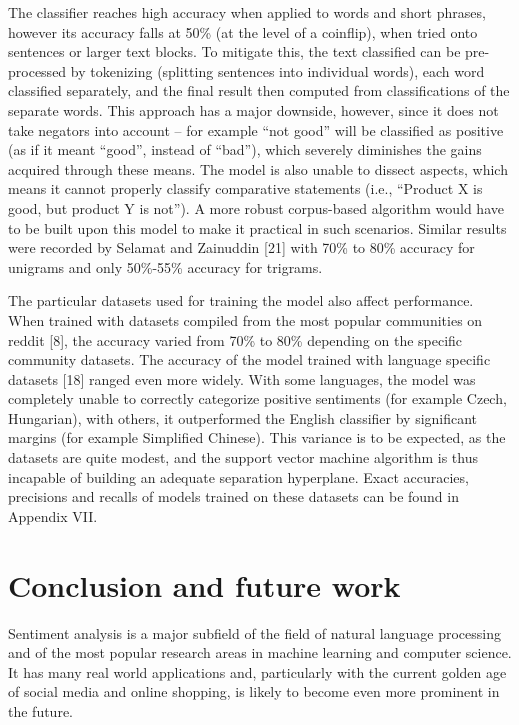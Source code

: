 \documentclass[12pt,journal,compsoc]{IEEEtran}
\begin{document}
The classifier reaches high accuracy when applied to words and short phrases, however its accuracy falls at 50\% (at the level of a coinflip), when tried onto sentences or larger text blocks. To mitigate this, the text classified can be pre-processed by tokenizing (splitting sentences into individual words), each word classified separately, and the final result then computed from classifications of the separate words. This approach has a major downside, however, since it does not take negators into account – for example “not good” will be classified as positive (as if it meant “good”, instead of “bad”), which severely diminishes the gains acquired through these means. The model is also unable to dissect aspects, which means it cannot properly classify comparative statements (i.e., “Product X is good, but product Y is not”). A more robust corpus-based algorithm would have to be built upon this model to make it practical in such scenarios. Similar results were recorded by Selamat and Zainuddin [21] with 70\% to 80\% accuracy for unigrams and only 50\%-55\% accuracy for trigrams.

The particular datasets used for training the model also affect performance. When trained with datasets compiled from the most popular communities on reddit [8], the accuracy varied from 70\% to 80\% depending on the specific community datasets. The accuracy of the model trained with language specific datasets [18] ranged even more widely. With some languages, the model was completely unable to correctly categorize positive sentiments (for example Czech, Hungarian), with others, it outperformed the English classifier by significant margins (for example Simplified Chinese). This variance is to be expected, as the datasets are quite modest, and the support vector machine algorithm is thus incapable of building an adequate separation hyperplane. Exact accuracies, precisions and recalls of models trained on these datasets can be found in Appendix VII.

\section{Conclusion and future work}
Sentiment analysis is a major subfield of the field of natural language processing and of the most popular research areas in machine learning and computer science. It has many real world applications and, particularly with the current golden age of social media and online shopping, is likely to become even more prominent in the future.
\end{document}
